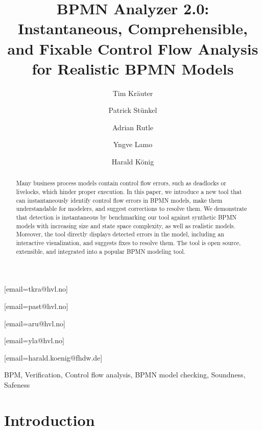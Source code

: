 \documentclass[
onecolumn, %
]{ceurart}
\begin{document}


\title{BPMN Analyzer 2.0: Instantaneous, Comprehensible, and Fixable Control Flow Analysis for Realistic BPMN Models}

\author[1]{Tim Kräuter}
[email=tkra@hvl.no]
\author[1]{Patrick Stünkel}
[email=past@hvl.no] %
\author[1]{Adrian Rutle}
[email=aru@hvl.no]
\author[1]{Yngve Lamo}
[email=yla@hvl.no]
\author[2,1]{Harald König}
[email=harald.koenig@fhdw.de]
\address[1]{Western Norway University of Applied Sciences, Bergen, Norway}
\address[2]{FHDW Hannover, Germany}

\begin{abstract}
Many business process models contain control flow errors, such as deadlocks or livelocks, which hinder proper execution.
In this paper, we introduce a new tool that can instantaneously identify control flow errors in BPMN models, make them understandable for modelers, and suggest corrections to resolve them.
We demonstrate that detection is instantaneous by benchmarking our tool against synthetic BPMN models with increasing size and state space complexity, as well as realistic models.
Moreover, the tool directly displays detected errors in the model, including an interactive visualization, and suggests fixes to resolve them.
The tool is open source, extensible, and integrated into a popular BPMN modeling tool.
\end{abstract}

\begin{keywords}
BPM,
Verification,
Control flow analysis,
BPMN model checking,
Soundness,
Safeness
\end{keywords}

\maketitle

\section{Introduction}
\end{document}
